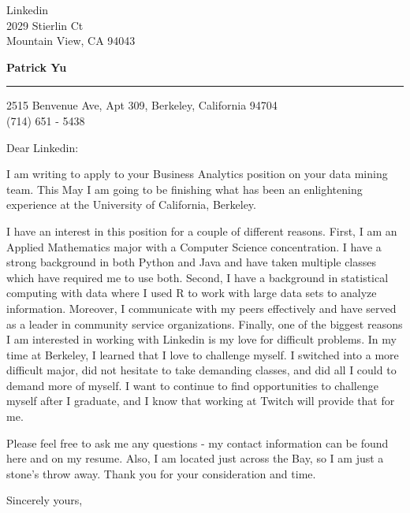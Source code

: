 \documentclass{letter} %
\begin{document}
\signature{Patrick Yu}           %
\longindentation=0pt                       %
\let\raggedleft\raggedright                %
 
 
\begin{letter}{
Linkedin\\
2029 Stierlin Ct\\
Mountain View, CA 94043}

\begin{flushleft}
{\large\bf Patrick Yu}
\end{flushleft}
\medskip\hrule height 1pt
\begin{flushright}
\hfill 2515 Benvenue Ave, Apt 309, Berkeley, California 94704 \\
\hfill (714) 651 - 5438
\end{flushright} 
\vfill %

 
\opening{Dear Linkedin:} 
 
\noindent I am writing to apply to your Business Analytics position on your data mining team. This May I am going to be finishing what has been an enlightening experience at the University of California, Berkeley. 

\noindent I have an interest in this position for a couple of different reasons. First, I am an Applied Mathematics major with a Computer Science concentration. I have a strong background in both Python and Java and have taken multiple classes which have required me to use both. Second, I have a background in statistical computing with data where I used R to work with large data sets to analyze information. Moreover, I communicate with my peers effectively and have served as a leader in community service organizations. Finally, one of the biggest reasons I am interested in working with Linkedin is my love for difficult problems. In my time at Berkeley, I learned that I love to challenge myself. I switched into a more difficult major, did not hesitate to take demanding classes, and did all I could to demand more of myself. I want to continue to find opportunities to challenge myself after I graduate, and I know that working at Twitch will provide that for me.

\noindent Please feel free to ask me any questions - my contact information can be found here and on my resume. Also, I am located just across the Bay, so I am just a stone's throw away. Thank you for your consideration and time.
 
\closing{Sincerely yours,} 
 

 

\end{letter}
 
\end{document}
